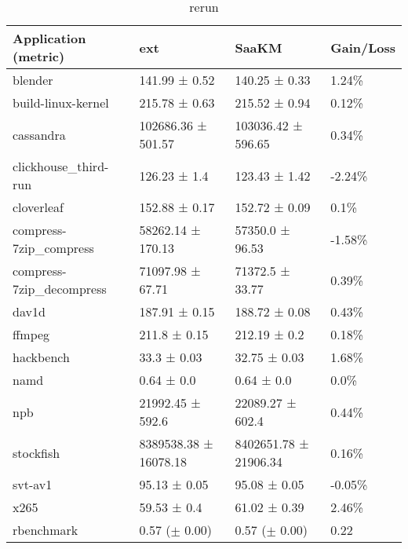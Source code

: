 \begin{table*}[p]
        \centering
        \caption{rerun}
        \label{tab:bench-res}
        \begin{tabular}{|l|l|l|l|}
        \hline
                Application (metric) &ext & SaaKM & Gain/Loss \\
                \hline
blender & 141.99 ± 0.52 & 140.25 ± 0.33 & 1.24\% \\
build-linux-kernel & 215.78 ± 0.63 & 215.52 ± 0.94 & 0.12\% \\
cassandra & 102686.36 ± 501.57 & 103036.42 ± 596.65 & 0.34\% \\
clickhouse\_third-run & 126.23 ± 1.4 & 123.43 ± 1.42 & -2.24\% \\
cloverleaf & 152.88 ± 0.17 & 152.72 ± 0.09 & 0.1\% \\
compress-7zip\_compress & 58262.14 ± 170.13 & 57350.0 ± 96.53 & -1.58\% \\
compress-7zip\_decompress & 71097.98 ± 67.71 & 71372.5 ± 33.77 & 0.39\% \\
dav1d & 187.91 ± 0.15 & 188.72 ± 0.08 & 0.43\% \\
ffmpeg & 211.8 ± 0.15 & 212.19 ± 0.2 & 0.18\% \\
hackbench & 33.3 ± 0.03 & 32.75 ± 0.03 & 1.68\% \\
namd & 0.64 ± 0.0 & 0.64 ± 0.0 & 0.0\% \\
npb & 21992.45 ± 592.6 & 22089.27 ± 602.4 & 0.44\% \\
stockfish & 8389538.38 ± 16078.18 & 8402651.78 ± 21906.34 & 0.16\% \\
svt-av1 & 95.13 ± 0.05 & 95.08 ± 0.05 & -0.05\% \\
x265 & 59.53 ± 0.4 & 61.02 ± 0.39 & 2.46\% \\
rbenchmark & 0.57 ($\pm$ 0.00) & 0.57 ($\pm$ 0.00) & 0.22 \\

                \hline
        
        \end{tabular}
\end{table*}